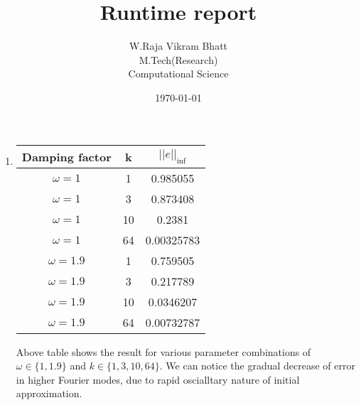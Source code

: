 \documentclass{report}
\begin{document}
\title{Runtime report}
\author{W.Raja Vikram Bhatt\\
	M.Tech(Research)\\		
	Computational Science}
\date{\today}
\maketitle
\begin{enumerate}
\item
\begin{tabular}{|c|c|c|}
\hline
Damping factor & k & $||e||_{\inf}$\\
\hline
$\omega = 1$ & 1 & 0.985055\\
$\omega = 1$ & 3&0.873408\\
$\omega = 1$ &10& 0.2381\\
$\omega = 1$ &64 & 0.00325783\\
\hline
$\omega = 1.9$ &1&0.759505\\
$\omega =1.9$ &3& 0.217789\\
$\omega =1.9$ &10&0.0346207\\
$\omega =1.9$ &64& 0.00732787\\ 
\hline
\end{tabular}
\par
Above table shows the result for various parameter combinations of $\omega \in\{1,1.9\}$ and $k\in\{1,3,10,64\}$. We can notice the gradual decrease of error in higher Fourier modes, due to rapid oscialltary nature of initial approximation.
\end{enumerate}
\end{document}
